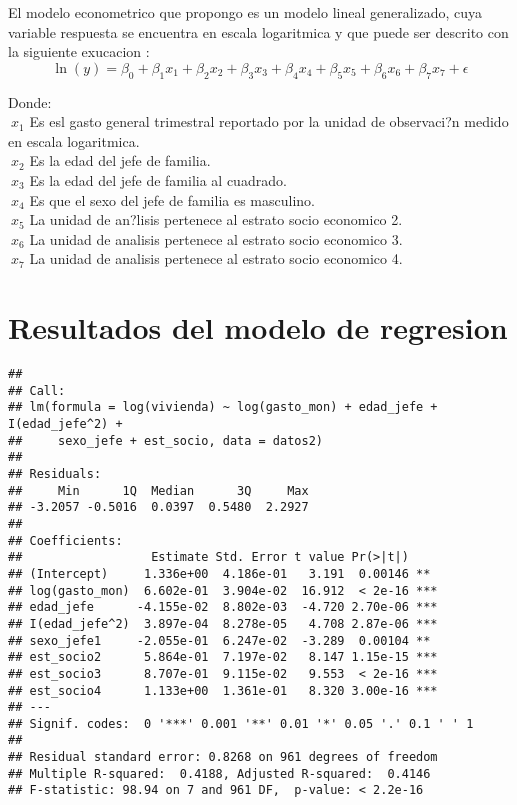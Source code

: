 \documentclass[]{book}
\begin{document}
El modelo econometrico que propongo es un modelo lineal generalizado,
cuya variable respuesta se encuentra en escala logaritmica y que puede
ser descrito con la siguiente exucacion :\\
\[\ln(y) = \beta_{0} + \beta_{1}x_{1} + \beta_{2}x_{2} + \beta_{3}x_{3} + \beta_{4}x_{4} + \beta_{5}x_{5} +  \beta_{6}x_{6} + \beta_{7}x_{7} + \epsilon \]

Donde:\\
\(\ x_{1}\) Es esl gasto general trimestral reportado por la unidad de
observaci?n medido en escala logaritmica.\\
\(\ x_{2}\) Es la edad del jefe de familia.\\
\(\ x_{3}\) Es la edad del jefe de familia al cuadrado.\\
\(\ x_{4}\) Es que el sexo del jefe de familia es masculino.\\
\(\ x_{5}\) La unidad de an?lisis pertenece al estrato socio economico
2.\\
\(\ x_{6}\) La unidad de analisis pertenece al estrato socio economico
3.\\
\(\ x_{7}\) La unidad de analisis pertenece al estrato socio economico
4.

\section{Resultados del modelo de
regresion}\label{resultados-del-modelo-de-regresion}

\begin{verbatim}
## 
## Call:
## lm(formula = log(vivienda) ~ log(gasto_mon) + edad_jefe + I(edad_jefe^2) + 
##     sexo_jefe + est_socio, data = datos2)
## 
## Residuals:
##     Min      1Q  Median      3Q     Max 
## -3.2057 -0.5016  0.0397  0.5480  2.2927 
## 
## Coefficients:
##                  Estimate Std. Error t value Pr(>|t|)    
## (Intercept)     1.336e+00  4.186e-01   3.191  0.00146 ** 
## log(gasto_mon)  6.602e-01  3.904e-02  16.912  < 2e-16 ***
## edad_jefe      -4.155e-02  8.802e-03  -4.720 2.70e-06 ***
## I(edad_jefe^2)  3.897e-04  8.278e-05   4.708 2.87e-06 ***
## sexo_jefe1     -2.055e-01  6.247e-02  -3.289  0.00104 ** 
## est_socio2      5.864e-01  7.197e-02   8.147 1.15e-15 ***
## est_socio3      8.707e-01  9.115e-02   9.553  < 2e-16 ***
## est_socio4      1.133e+00  1.361e-01   8.320 3.00e-16 ***
## ---
## Signif. codes:  0 '***' 0.001 '**' 0.01 '*' 0.05 '.' 0.1 ' ' 1
## 
## Residual standard error: 0.8268 on 961 degrees of freedom
## Multiple R-squared:  0.4188, Adjusted R-squared:  0.4146 
## F-statistic: 98.94 on 7 and 961 DF,  p-value: < 2.2e-16
\end{verbatim}
\end{document}
